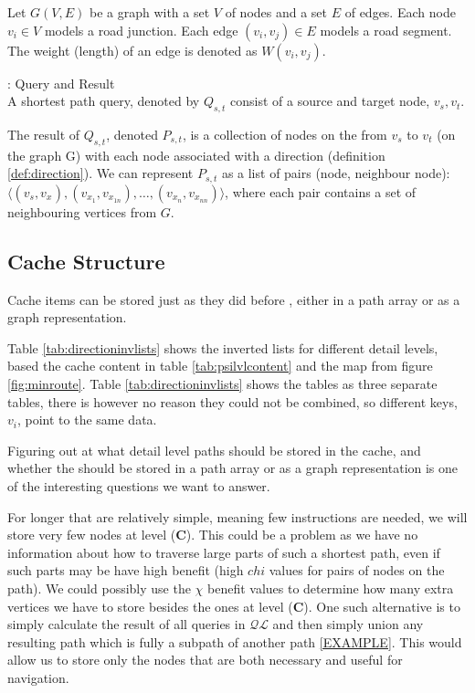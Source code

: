 \begin{definition}
Let $G(V, E)$ be a graph with a set $V$ of nodes and a set $E$ of edges.
Each node $v_i \in V$ models a road junction. Each edge $(v_i, v_j) \in
E$ models a road segment. The weight (length) of an edge is denoted as $W(v_i, v_j)$.
\end{definition}


\begin{definition}{\spathns: Query and Result}\\
A shortest path query, denoted by $Q_{s,t}$ consist of a source and target node, $v_s,v_t$.

The result of $Q_{s,t}$, denoted $P_{s,t}$, is a collection of nodes on the \spath from $v_s$ to $v_t$ (on the graph G) with each node associated with a direction (definition \ref{def:direction}).
We can represent $P_{s,t}$ as a list of pairs (node, neighbour node): $\langle (v_{s},v_{x_{}}), (v_{x_1},v_{x_{1n}}), \dots ,(v_{x_n},v_{x_{nn}}) \rangle$, where each pair contains a set of neighbouring vertices from $G$.
\end{definition}




\subsection{Cache Structure}

Cache items can be stored just as they did before \cite{thomsen2012}, either in a path array or as a graph representation. 

Table \ref{tab:directioninvlists} shows the inverted lists for different detail levels, based the cache content in table \ref{tab:psilvlcontent} and the map from figure \ref{fig:minroute}. Table \ref{tab:directioninvlists} shows the tables as three separate tables, there is however no reason they could not be combined, so different keys, $v_i$, point to the same data.

Figuring out at what detail level paths should be stored in the cache, and whether the should be stored in a path array or as a graph representation is one of the interesting questions we want to answer. 

For longer \spaths that are relatively simple, meaning few instructions are needed, we will store very few nodes at level (\textbf{C}). This could be a problem as we have no information about how to traverse large parts of such a shortest path, even if such parts may be have high benefit (high $chi$ values for pairs of nodes on the path). We could possibly use the $\chi$ benefit values to determine how many extra vertices we have to store besides the ones at level (\textbf{C}). One such alternative is to simply calculate the result of all queries in $\mathcal{QL}$ and then simply union any resulting path which is fully a subpath of another path \ref{EXAMPLE}. This would allow us to store only the nodes that are both necessary and useful for navigation.


